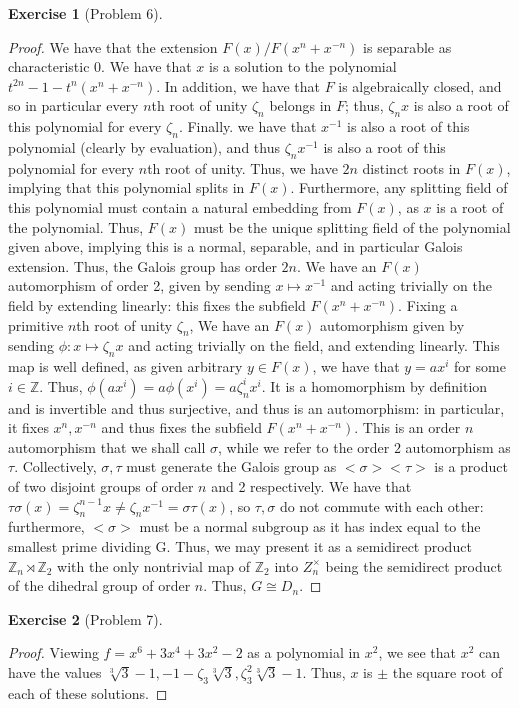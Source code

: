 \documentclass{article}
\newtheorem{exercise}{Exercise}
\begin{document}
\begin{exercise}[Problem 6]
\end{exercise}
\begin{proof}
  We have that the extension $F(x)/F(x^{n}+x^{-n})$ is separable as characteristic 0. We have that $x$ is a solution to the polynomial $t^{2n}-1 - t^{n}(x^{n}+x^{-n})$. In addition, we have that $F$ is algebraically closed, and so in particular every $n$th root of unity $\zeta_{n}$ belongs in $F$; thus, $\zeta_{n}x$ is also a root of this polynomial for every $\zeta_{n}$. Finally. we have that $x^{-1}$ is also a root of this polynomial (clearly by evaluation), and thus $\zeta_{n}x^{-1}$ is also a root of this polynomial for every $n$th root of unity. Thus, we have $2n$ distinct roots in $F(x)$, implying that this polynomial splits in $F(x)$. Furthermore, any splitting field of this polynomial must contain a natural embedding from $F(x)$, as $x$ is a root of the polynomial. Thus, $F(x)$ must be the unique splitting field of the polynomial given above, implying this is a normal, separable, and in particular Galois extension. Thus, the Galois group has order $2n$. We have an $F(x)$ automorphism of order 2, given by sending $x \mapsto x^{-1}$ and acting trivially on the field by extending linearly: this fixes the subfield $F(x^{n}+x^{-n})$. Fixing a primitive $n$th root of unity $\zeta_{n}$, We have an $F(x)$ automorphism given by sending $\phi: x \mapsto \zeta_{n}x$ and acting trivially on the field, and extending linearly. This map is well defined, as given arbitrary $y \in F(x)$, we have that $y = ax^{i}$ for some $i \in \mathbb{Z}$. Thus, $\phi(ax^{i}) = a \phi(x^{i}) = a \zeta_{n}^{i}x^{i}$. It is a homomorphism by definition and is invertible and thus surjective, and thus is an automorphism: in particular, it fixes $x^{n}, x^{-n}$ and thus fixes the subfield $F(x^{n}+x^{-n})$. This is an order $n$ automorphism that we shall call $\sigma$, while we refer to the order $2$ automorphism as $\tau$. Collectively, $\sigma,\tau$ must generate the Galois group as $<\sigma><\tau>$ is a product of two disjoint groups of order $n$ and 2 respectively. We have that $\tau\sigma(x) = \zeta_{n}^{n-1}x \neq \zeta_{n}x^{-1} = \sigma\tau(x)$, so $\tau, \sigma$ do not commute with each other: furthermore, $<\sigma>$ must be a normal subgroup as it has index equal to the smallest prime dividing G. Thus, we may present it as a semidirect product $\mathbb{Z}_{n}\rtimes \mathbb{Z}_{2}$ with the only nontrivial map of $\mathbb{Z}_{2}$ into $Z_{n}^{\times}$ being the semidirect product of the dihedral group of order $n$. Thus, $G \cong D_{n}$.
\end{proof}

\begin{exercise}[Problem 7]
\end{exercise}

\begin{proof}
Viewing $f = x^{6} + 3x^{4} + 3x^{2} - 2$ as a polynomial in $x^{2}$, we see that $x^{2}$ can have the values $\sqrt[3]{3} - 1, - 1 - \zeta_{3}\sqrt[3]{3}, \zeta_{3}^{2}\sqrt[3]{3} - 1$. Thus, $x$ is $\pm$ the square root of each of these solutions.   
\end{proof}
\end{document}
